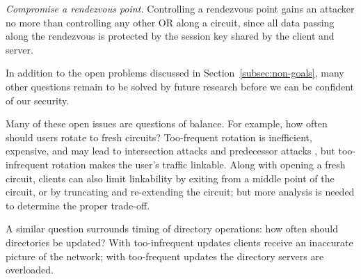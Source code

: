 \documentclass[times,10pt,twocolumn]{article}
\begin{document}
\emph{Compromise a rendezvous point.}  Controlling a rendezvous
point gains an attacker no more than controlling any other OR along
a circuit, since all data passing along the rendezvous is protected
by the session key shared by the client and server.

\label{sec:maintaining-anonymity}
 
In addition to the open problems discussed in
Section~\ref{subsec:non-goals}, many other questions remain to be
solved by future research before we can be confident of our security.

Many of these open issues are questions of balance.  For example,
how often should users rotate to fresh circuits?  Too-frequent
rotation is inefficient, expensive, and may lead to intersection attacks
and predecessor attacks \cite{wright03},
but too-infrequent rotation
makes the user's traffic linkable.   Along with opening a fresh
circuit, clients can also limit linkability by exiting from a middle point
of the circuit, or by truncating and re-extending the circuit; but
more analysis is needed to determine the proper trade-off.

A similar question surrounds timing of directory operations:
how often should directories be updated?  With too-infrequent
updates clients receive an inaccurate picture of the network; with
too-frequent updates the directory servers are overloaded.


\end{document}
